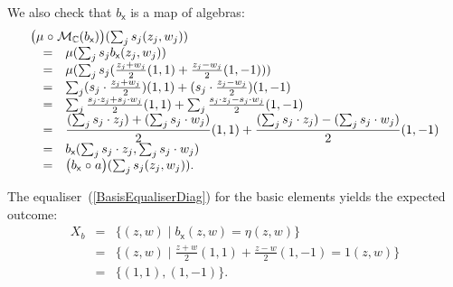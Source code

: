 \documentclass{LMCS}
\newcommand{\after}{\mathrel{\circ}}
\newcommand{\Mlt}{\ensuremath{\mathcal{M}}}
\newcommand{\set}[2]{\{#1\;|\;#2\}}
\begin{document}
\begin{exa}
{We also check that $b_{\textsf{x}}$ is a map of algebras:
$$\begin{array}{rcl}
\lefteqn{\textstyle\big(\mu \after \Mlt_{\mathbb{C}}(b_{\textsf{x}})\big)
   (\sum_{j}s_{j}(z_{j},w_{j}))} \\
& = &
\mu(\sum_{j}s_{j}b_{\textsf{x}}(z_{j},w_{j})) \\
& = &
\mu(\sum_{j}s_{j}(\frac{z_{j}+w_{j}}{2}(1,1) + \frac{z_{j}-w_{j}}{2}(1,-1))) \\
& = &
\sum_{j}(s_{j}\cdot\frac{z_{j}+w_{j}}{2})(1,1) + 
   (s_{j}\cdot\frac{z_{j}-w_{j}}{2})(1,-1) \\
& = &
\sum_{j}\frac{s_{j}\cdot z_{j}+s_{j}\cdot w_{j}}{2}(1,1) + 
   \sum_{j}\frac{s_{j}\cdot z_{j}-s_{j}\cdot w_{j}}{2}(1,-1) \\
& = &
{\displaystyle
\frac{(\sum_{j}s_{j}\cdot z_{j})+(\sum_{j}s_{j}\cdot w_{j})}{2}(1,1) + 
   \frac{(\sum_{j}s_{j}\cdot z_{j})-(\sum_{j}s_{j}\cdot w_{j})}{2}(1,-1)} \\
& = &
b_{\textsf{x}}(\sum_{j}s_{j}\cdot z_{j}, \sum_{j}s_{j}\cdot w_{j}) \\
& = &
\big(b_{\textsf{x}} \after a\big)(\sum_{j}s_{j}(z_{j},w_{j})).
\end{array}$$

The equaliser~(\ref{BasisEqualiserDiag}) for the basic elements
yields the expected outcome:
$$\begin{array}{rcl}
X_{b}
& = &
\set{(z,w)}{b_{\textsf{x}}(z,w) = \eta(z,w)} \\
& = &
\set{(z,w)}{\frac{z+w}{2}(1,1) + \frac{z-w}{2}(1,-1) = 1(z,w)} \\
& = &
\{(1,1), (1,-1)\}.
\end{array}$$
}


\end{exa}
\end{document}
